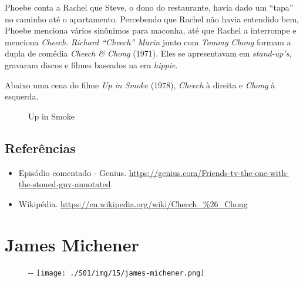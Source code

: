 Phoebe conta a Rachel que Steve, o dono do restaurante, havia dado um
``tapa'' no caminho até o apartamento. Percebendo que Rachel não havia
entendido bem, Phoebe menciona vários sinônimos para maconha, até que
Rachel a interrompe e menciona \emph{Cheech}. \emph{Richard ``Cheech''
Marin} junto com \emph{Tommy Chong} formam a dupla de comédia
\emph{Cheech \& Chong} (1971). Eles se apresentavam em
\emph{stand-up's}, gravaram discos e filmes baseados na era
\emph{hippie}.

Abaixo uma cena do filme \emph{Up in Smoke} (1978), \emph{Cheech} à
direita e \emph{Chong} à esquerda.

\begin{figure}
  \centering
    \caption{Up in Smoke\label{fig:up-in-smoke}}
\end{figure}

\hypertarget{referuxeancias-4}{%
\subsection{Referências}\label{referuxeancias-4}}

\begin{itemize}
\tightlist
\item
  \sloppy Episódio comentado - Genius. \url{https://genius.com/Friends-tv-the-one-with-the-stoned-guy-annotated}
\item
  \sloppy Wikipédia. \url{https://en.wikipedia.org/wiki/Cheech_%26_Chong}
\end{itemize}

\hypertarget{james-michener}{%
\section{James Michener}\label{james-michener}}

\begin{figure}[!ht]
  \begin{adjustwidth}{-\oddsidemargin-1in}{-\rightmargin}
    \centering
    \texttt{[image: ./S01/img/15/james-michener.png]}
  \end{adjustwidth}
\end{figure}

